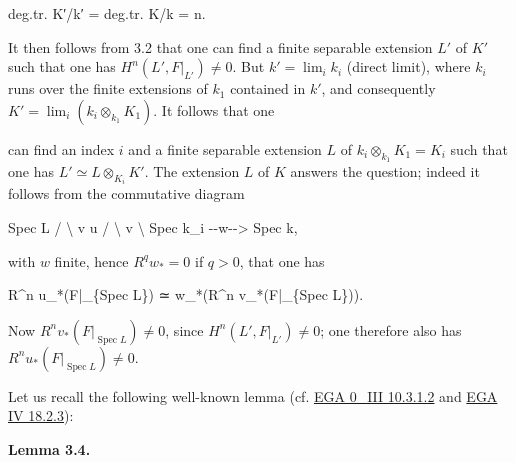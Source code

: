 \documentclass[
  11pt,
  a4paper,
]{book}
\newenvironment{Shaded}{}{}
\newcommand{\NormalTok}[1]{#1}
\begin{document}
\begin{Shaded}
\begin{Highlighting}[]
\NormalTok{deg.tr. K′/k′ = deg.tr. K/k = n.}
\end{Highlighting}
\end{Shaded}

It then follows from 3.2 that one can find a finite separable extension
\(L'\) of \(K'\) such that one has \(H^{n}(L',
F|_{L'}) \neq 0\). But \(k' = \lim_{i} k_{i}\) (direct limit), where
\(k_{i}\) runs over the finite extensions of \(k_{1}\) contained in
\(k'\), and consequently
\(K' = \lim_{i} (k_{i} \otimes_{k_{1}} K_{1})\). It follows that one

can find an index \(i\) and a finite separable extension \(L\) of
\(k_{i} \otimes_{k_{1}} K_{1} = K_{i}\) such that one has
\(L' \simeq L \otimes_{K_{i}} K'\). The extension \(L\) of \(K\) answers
the question; indeed it follows from the commutative diagram

\begin{Shaded}
\begin{Highlighting}[]
\NormalTok{        Spec L}
\NormalTok{       /     \textbackslash{}}
\NormalTok{      v       u}
\NormalTok{     /         \textbackslash{}}
\NormalTok{    v           \textbackslash{}}
\NormalTok{Spec k\_i {-}{-}w{-}{-}\textgreater{} Spec k,}
\end{Highlighting}
\end{Shaded}

with \(w\) finite, hence \(R^{q} w_{*} = 0\) if \(q > 0\), that one has

\begin{Shaded}
\begin{Highlighting}[]
\NormalTok{R\^{}n u\_*(F|\_\{Spec L\}) ≃ w\_*(R\^{}n v\_*(F|\_\{Spec L\})).}
\end{Highlighting}
\end{Shaded}

Now \(R^{n} v_{*}(F|_{\operatorname{Spec} L}) \neq 0\), since
\(H^{n}(L', F|_{L'}) \neq 0\); one therefore also has \(R^{n}
u_{*}(F|_{\operatorname{Spec} L}) \neq 0\).

Let us recall the following well-known lemma (cf.
\href{https://jcreinhold.github.io/ega/iii/03-ch0-10-complements-flat-modules.html\#103-existence-of-flat-extensions-of-local-rings}{EGA
0\_III 10.3.1.2} and
\href{https://jcreinhold.github.io/ega/iv/31-ch4-18-complements-etale-morphisms.html\#182-étale-covers}{EGA
IV 18.2.3}):

\textbf{Lemma 3.4.}
\end{document}
